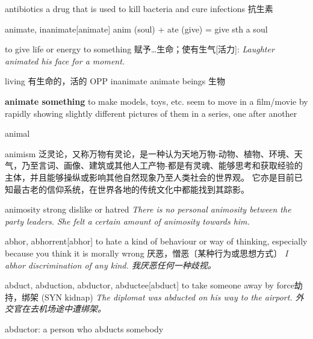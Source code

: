 \begin{DefWord}{antibiotics}
    a drug that is used to kill bacteria and cure infections 抗生素
\end{DefWord}

\begin{DefWord}{animate, inanimate}[animate]
    anim (soul) + ate (give) = give sth a soul

    to give life or energy to something 赋予…生命；使有生气[活力]:
    \textit{Laughter animated his face for a moment.}

    living 有生命的，活的 OPP  inanimate
    animate beings 生物 

    \textbf{animate something} to make models, toys, etc. seem to move in a film/movie by rapidly showing slightly different pictures of them in a series, one after another
\end{DefWord}

\begin{DefWord}{animal}
\end{DefWord}

\begin{DefWord}{animism}
    泛灵论，又称万物有灵论，是一种认为天地万物-动物、植物、环境、天气，乃至言词、画像、建筑或其他人工产物-都是有灵魂、能够思考和获取经验的主体，并且能够操纵或影响其他自然现象乃至人类社会的世界观。 它亦是目前已知最古老的信仰系统，在世界各地的传统文化中都能找到其踪影。 
\end{DefWord}

\begin{DefWord}{animosity}
    strong dislike or hatred
    \textit{There is no personal animosity between the party leaders. She felt a certain amount of animosity towards him.}
\end{DefWord}

\begin{DefWord}{abhor, abhorrent}[abhor]
    to hate a kind of behaviour or way of thinking, especially because you think it is morally wrong 厌恶，憎恶〔某种行为或思想方式〕
 \textit{I abhor discrimination of any kind. 我厌恶任何一种歧视。 }
\end{DefWord}

\begin{DefWord}{abduct, abduction, abductor, abductee}[abduct]
    to take someone away by force劫持，绑架 (SYN  kidnap)
    \textit{The diplomat was abducted on his way to the airport.  外交官在去机场途中遭绑架。 }

    abductor: a person who abducts somebody
\end{DefWord}